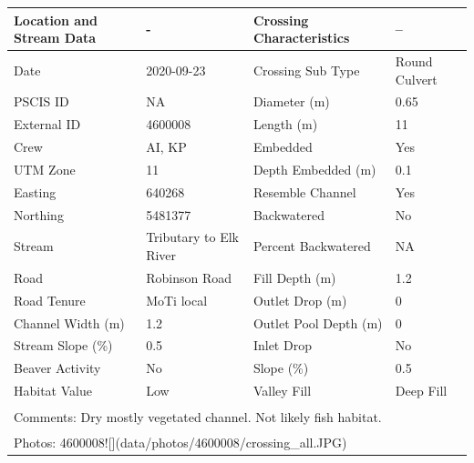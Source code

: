 \documentclass[
]{book}
\begin{document}
\begin{tabular}{l|l|l|l}
\hline
Location and Stream Data & - & Crossing Characteristics & --\\
\hline
Date & 2020-09-23 & Crossing Sub Type & Round Culvert\\
\hline
PSCIS ID & NA & Diameter (m) & 0.65\\
\hline
External ID & 4600008 & Length (m) & 11\\
\hline
Crew & AI, KP & Embedded & Yes\\
\hline
UTM Zone & 11 & Depth Embedded (m) & 0.1\\
\hline
Easting & 640268 & Resemble Channel & Yes\\
\hline
Northing & 5481377 & Backwatered & No\\
\hline
Stream & Tributary to Elk River & Percent Backwatered & NA\\
\hline
Road & Robinson Road & Fill Depth (m) & 1.2\\
\hline
Road Tenure & MoTi local & Outlet Drop (m) & 0\\
\hline
Channel Width (m) & 1.2 & Outlet Pool Depth (m) & 0\\
\hline
Stream Slope (\%) & 0.5 & Inlet Drop & No\\
\hline
Beaver Activity & No & Slope (\%) & 0.5\\
\hline
Habitat Value & Low & Valley Fill & Deep Fill\\
\hline
\multicolumn{4}{l}{\textsuperscript{} Comments: Dry mostly vegetated channel. Not likely fish habitat.}\\
\multicolumn{4}{l}{\textsuperscript{} Photos: 4600008![](data/photos/4600008/crossing\_all.JPG)}\\
\end{tabular}
\end{document}
